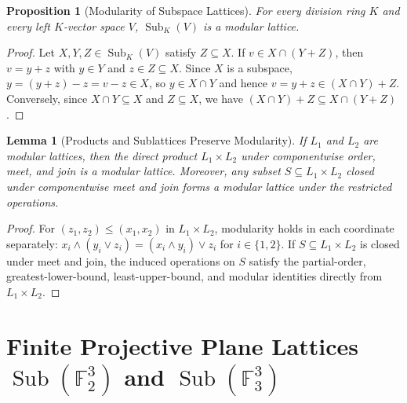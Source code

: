 \documentclass[11pt]{article}
\newtheorem{lemma}[theorem]{Lemma}
\newtheorem{proposition}[theorem]{Proposition}
\theoremstyle{definition}
\newcommand{\Sub}{\operatorname{Sub}}
\newcommand{\FF}{\mathbb{F}}
\begin{document}
\begin{proposition}[Modularity of Subspace Lattices]\label{prop:sub-mod}
For every division ring $K$ and every left $K$-vector space $V$, $\Sub_K(V)$ is a
modular lattice.
\end{proposition}
\begin{proof}
Let $X, Y, Z \in \Sub_K(V)$ satisfy $Z \subseteq X$. If $v \in X \cap (Y + Z)$, then
$v = y + z$ with $y \in Y$ and $z \in Z \subseteq X$. Since $X$ is a subspace,
$y = (y + z) - z = v - z \in X$, so $y \in X \cap Y$ and hence
$v = y + z \in (X \cap Y) + Z$. Conversely, since $X \cap Y \subseteq X$ and
$Z \subseteq X$, we have $(X \cap Y) + Z \subseteq X \cap (Y + Z)$.
\end{proof}

\begin{lemma}[Products and Sublattices Preserve Modularity]\label{lem:prod-mod}
If $L_1$ and $L_2$ are modular lattices, then the direct product $L_1 \times L_2$ under
componentwise order, meet, and join is a modular lattice. Moreover, any subset
$S \subseteq L_1 \times L_2$ closed under componentwise meet and join forms a modular
lattice under the restricted operations.
\end{lemma}
\begin{proof}
For $(z_1, z_2) \le (x_1, x_2)$ in $L_1 \times L_2$, modularity holds in each coordinate
separately: $x_i \wedge (y_i \vee z_i) = (x_i \wedge y_i) \vee z_i$ for $i \in \{1, 2\}$.
If $S \subseteq L_1 \times L_2$ is closed under meet and join, the induced operations on
$S$ satisfy the partial-order, greatest-lower-bound, least-upper-bound, and modular
identities directly from $L_1 \times L_2$.
\end{proof}

\section{Finite Projective Plane Lattices \texorpdfstring{$\Sub(\FF_2^3)$ and $\Sub(\FF_3^3)$}{Sub(F2\^3) and Sub(F3\^3)}}
\end{document}
